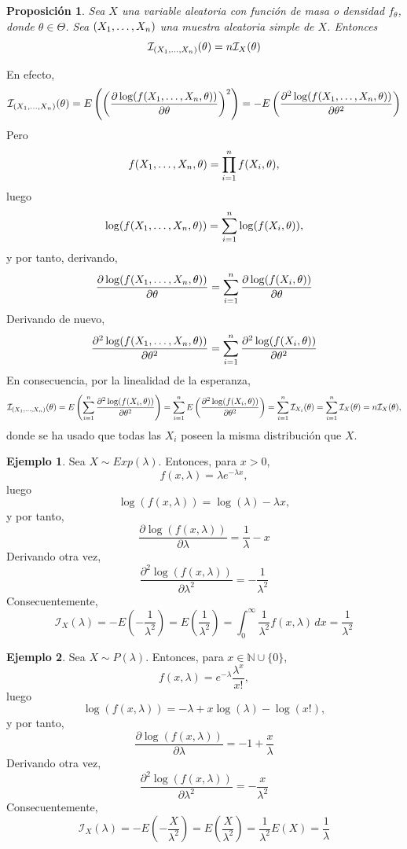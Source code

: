 \documentclass[11pt]{report}
\makeatletter
\renewenvironment{proof}[1][\proofname]{\par
  \pushQED{\qed}%
  \normalfont \topsep\z@skip %
  \trivlist
  \item[\hskip\labelsep
        \itshape
    #1\@addpunct{.}]\ignorespaces
}{%
  \popQED\endtrivlist\@endpefalse
}
\newtheorem{proposition}{Proposición}
\theoremstyle{definition}
\newtheorem{example}{Ejemplo}
\newcommand{\N}{\mathbb N}
\makeatother
\begin{document}
\begin{proposition}
Sea $X$ una variable aleatoria con función de masa o densidad $f_\theta$, donde $\theta \in \Theta$. Sea $(X_1,\mathellipsis,X_n)$ una muestra aleatoria simple de $X$. Entonces
\[\mathcal{I}_{(X_1,\mathellipsis,X_n)}(\theta) = n\mathcal{I}_X(\theta)\]
\end{proposition}

\begin{proof}
En efecto,
\[\mathcal{I}_{(X_1,\mathellipsis,X_n)}(\theta) = E\left(\left(\frac{\partial\log(f(X_1,\mathellipsis,X_n,\theta))}{\partial \theta}\right)^2\right) = -E\left(\frac{\partial^2\log(f(X_1,\mathellipsis,X_n,\theta))}{\partial \theta^2}\right)\]
Pero
\[f(X_1,\mathellipsis,X_n,\theta) = \prod_{i=1}^nf(X_i,\theta),\]
luego
\[\log(f(X_1,\mathellipsis,X_n,\theta))=\sum_{i=1}^n \log( f(X_i,\theta)),\]
y por tanto, derivando,
\[\frac{\partial\log (f(X_1,\mathellipsis,X_n,\theta))}{\partial \theta} = \sum_{i=1}^n \frac{\partial\log(f(X_i,\theta))}{\partial \theta}\]
Derivando de nuevo,
\[\frac{\partial^2\log(f(X_1,\mathellipsis,X_n,\theta))}{\partial \theta^2} = \sum_{i=1}^n \frac{\partial^2\log(f(X_i,\theta))}{\partial \theta^2}\]
En consecuencia, por la linealidad de la esperanza,
\[\mathcal{I}_{(X_1,\mathellipsis,X_n)}(\theta) = E\left(\sum_{i=1}^n \frac{\partial^2\log(f(X_i,\theta))}{\partial \theta^2}\right) =\sum_{i=1}^nE\left(\frac{\partial^2\log(f(X_i,\theta))}{\partial \theta^2}\right) =\sum_{i=1}^n \mathcal{I}_{X_i}(\theta) = \sum_{i=1}^n \mathcal{I}_{X}(\theta) = n\mathcal{I}_{X}(\theta),\]
donde se ha usado que todas las $X_i$ poseen la misma distribución que $X$.
\end{proof}

\begin{example}
Sea $X \sim Exp(\lambda)$. Entonces, para $x>0$,
\[f(x,\lambda)=\lambda e^{-\lambda x},\]
luego
\[\log(f(x,\lambda)) = \log(\lambda)-\lambda x,\]
y por tanto,
\[\frac{\partial \log(f(x,\lambda))}{\partial \lambda} = \frac{1}{\lambda}-x\]
Derivando otra vez,
\[\frac{\partial^2\log(f(x,\lambda))}{\partial \lambda^2} = -\frac{1}{\lambda^2}\]
Consecuentemente,
\[\mathcal{I}_X(\lambda) = -E\left(-\frac{1}{\lambda^2}\right) =E\left(\frac{1}{\lambda^2}\right) =\int_{0}^\infty \frac{1}{\lambda^2}f(x,\lambda)\, dx = \frac{1}{\lambda^2}\]
\end{example}

\begin{example}
Sea $X \sim P(\lambda)$. Entonces, para $x \in \N \cup \{0\}$,
\[f(x,\lambda)=e^{-\lambda} \frac{\lambda^x}{x!},\]
luego
\[\log(f(x,\lambda)) = -\lambda+x\log(\lambda)-\log(x!),\]
y por tanto,
\[\frac{\partial \log(f(x,\lambda))}{\partial \lambda} = -1+\frac{x}{\lambda}\]
Derivando otra vez,
\[\frac{\partial^2\log(f(x,\lambda))}{\partial \lambda^2} = -\frac{x}{\lambda^2}\]
Consecuentemente,
\[\mathcal{I}_X(\lambda) = -E\left(-\frac{X}{\lambda^2}\right) =E\left(\frac{X}{\lambda^2}\right) =\frac{1}{\lambda^2}E\left(X\right) = \frac{1}{\lambda}\]
\end{example}
\end{document}
